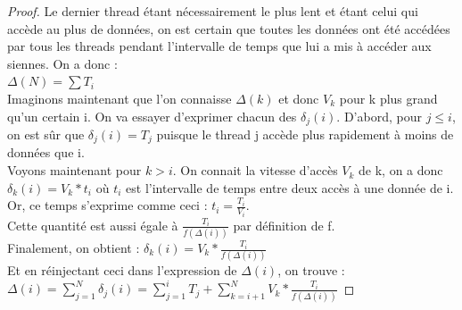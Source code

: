 \documentclass{report}
\begin{document}
\begin{proof}
  Le dernier thread étant nécessairement le plus lent et étant celui qui accède au plus de données,
  on est certain que toutes les données ont été accédées par tous les threads pendant l'intervalle
  de temps que lui a mis à accéder aux siennes. On a donc :
  \\$\Delta(N) = \sum{T_i}$
  \\Imaginons maintenant que l'on connaisse $\Delta(k)$ et donc $V_k$ pour k plus grand qu'un certain i.
  On va essayer d'exprimer chacun des $\delta_j(i)$. D'abord, pour $j \leq i$, on est sûr que 
  $\delta_j(i) = T_j$ puisque le thread j accède plus rapidement à moins de données que i. 
  \\Voyons maintenant pour $k > i$. On connait la vitesse d'accès $V_k$ de k, on a donc
  $\delta_k(i) = V_k * t_i $ où $t_i$ est l'intervalle de temps entre deux accès à une donnée de i.
  Or, ce temps s'exprime comme ceci : $t_i = \frac{T_i}{V_i} $.
  \\ Cette quantité est aussi égale à $\frac{T_i}{f(\Delta(i))}$ par définition de f.
  \\Finalement, on obtient : 
  $\delta_k(i) = V_k * \frac{T_i}{f(\Delta(i))}$
\\ Et en réinjectant ceci dans l'expression de $\Delta(i)$, on trouve : 
\\  $\Delta(i) = \sum_{j=1}^{N}{\delta_j(i)} = \sum_{j=1}^{i}{T_j} + \sum_{k=i+1}^{N}{V_k} * \frac{T_i}{f(\Delta(i))}$
\end{proof}
\end{document}
